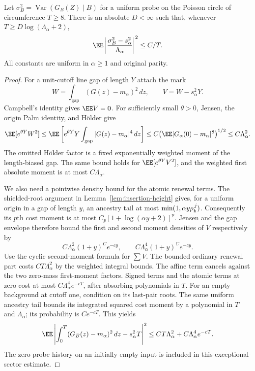 \documentclass[11pt,letterpaper]{article}
\begin{document}
\begin{proposition}
\label{prop:Poisson-conditional-capture-variance}
Let $\sigma_B^2=\operatorname{Var}(G_B(Z)\mid B)$ for a uniform
probe on the Poisson circle of circumference $T\ge8$.
There is an absolute $D<\infty$ such that, whenever
$T\ge D\log(\Lambda_\alpha+2)$,
\begin{equation}\label{eq:Poisson-conditional-capture-variance}
 \EE\left|\frac{\sigma_B^2-s_\alpha^2}{\Lambda_\alpha}\right|^2
                       \le C/T.
\end{equation}
All constants are uniform in $\alpha\ge1$ and original parity.
\end{proposition}
\begin{proof}
For a unit-cutoff line gap of length $Y$ attach the mark
\[
 W=\int_{\text{gap}}(G(z)-m_\alpha)^2\,dz,\qquad
 V=W-s_\alpha^2Y.
\]
Campbell's identity gives $\EE V=0$. For sufficiently small
$\theta>0$, Jensen, the origin Palm identity, and H\"older give
\[
 \EE[e^{\theta Y}W^2]
 \le \EE\left[e^{\theta Y}Y
                \int_{\text{gap}}|G(z)-m_\alpha|^4\,dz\right]
 \le C\bigl(\EE|G_\alpha(0)-m_\alpha|^8\bigr)^{1/2}
 \le C\Lambda_\alpha^2.
\]
The omitted H\"older factor is a fixed exponentially weighted
moment of the length-biased gap. The same bound holds for
$\EE[e^{\theta Y}V^2]$, and the weighted first absolute moment
is at most $C\Lambda_\alpha$.

We also need a pointwise density bound for the atomic renewal
terms. The shielded-root argument in
Lemma~\ref{lem:insertion-height} gives, for a uniform origin in
a gap of length $y$, an ancestry tail at most
$\min(1,\alpha y\rho_{\rm h}^{\,j})$. Consequently its $p$th
cost moment is at most $C_p[1+\log(\alpha y+2)]^p$.
Jensen and the gap envelope therefore bound the first and
second moment densities of $V$ respectively by
\[
 C\Lambda_\alpha^2(1+y)^C e^{-cy},
 \qquad
 C\Lambda_\alpha^4(1+y)^C e^{-cy}.
\]
Use the cyclic second-moment formula for $\sum V$.
The bounded ordinary renewal part costs $CT\Lambda_\alpha^2$
by the weighted integral bounds. The affine term cancels
against the two zero-mass first-moment factors. Signed terms
and the atomic terms at zero cost at most
$C\Lambda_\alpha^4e^{-cT}$, after absorbing polynomials in $T$.
For an empty background at cutoff one, condition on its
last-pair roots. The same uniform ancestry tail bounds its
integrated squared cost moment by a polynomial in $T$ and
$\Lambda_\alpha$; its probability is $Ce^{-cT}$. This yields
\begin{equation}\label{eq:integrated-squared-capture-bound}
 \EE\left|
    \int_0^T(G_B(z)-m_\alpha)^2\,dz-s_\alpha^2T
       \right|^2
 \le CT\Lambda_\alpha^2+C\Lambda_\alpha^4e^{-cT}.
\end{equation}
The zero-probe history on an initially empty input is included
in this exceptional-sector estimate.


\end{proof}
\end{document}
